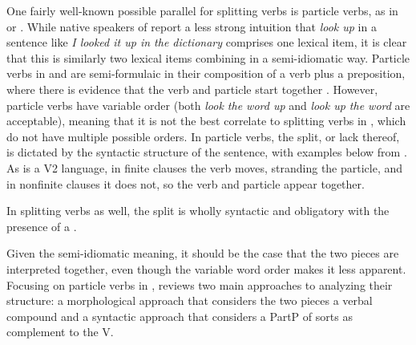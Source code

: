 \documentclass[output=paper,newtxmath,modfonts,nonflat,draftmode]{langsci/langscibook}
\begin{document}
One fairly well-known possible parallel for splitting verbs is particle verbs, as in  or . While native speakers of  report a less strong intuition that \textit{look up} in a sentence like \textit{I looked it up in the dictionary} comprises one lexical item, it is clear that this is similarly two lexical items combining in a semi-idiomatic way. Particle verbs in  and  are semi-formulaic in their composition of a verb plus a preposition, where there is evidence that the verb and particle start together \citep{Johnson1991}. However,  particle verbs have variable order (both \textit{look the word up} and \textit{look up the word} are acceptable), meaning that it is not the best correlate to splitting verbs in , which do not have multiple possible orders. In  particle verbs, the split, or lack thereof, is dictated by the syntactic structure of the sentence, with examples below from \citet{Zeller2001}. As  is a V2 language, in finite clauses the verb moves, stranding the particle, and in nonfinite clauses it does not, so the verb and particle appear together.

\ea
 \z \label{german}
\z


In  splitting verbs as well, the split is wholly syntactic and obligatory with the presence of a . 

Given the semi-idiomatic meaning, it should be the case that the two pieces are interpreted together, even though the variable word order makes it less apparent. Focusing on particle verbs in , \citet{Zeller2001} reviews two main approaches to analyzing their structure: a morphological approach that considers the two pieces a verbal compound and a syntactic approach that considers a PartP of sorts as complement to the V. 
\end{document}
